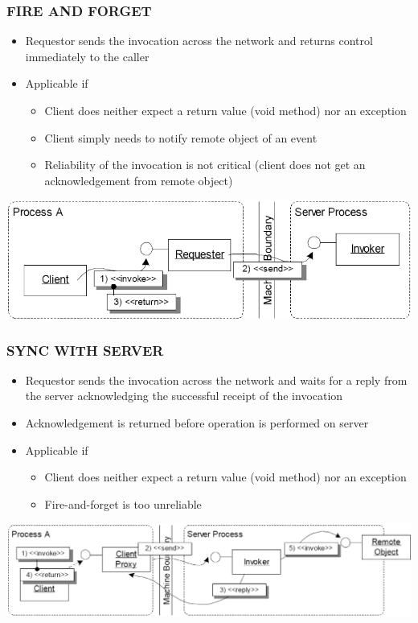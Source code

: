 \documentclass[10pt]{article}
\begin{document}
\subsubsection{FIRE AND FORGET}
\begin{itemize}
	\item Requestor sends the invocation across the network and returns control immediately to the caller
	\item Applicable if
		\begin{itemize}
			\item Client does neither expect a return value (void method) nor an exception
			\item Client simply needs to notify remote object of an event
			\item Reliability of the invocation is not critical (client does not get an acknowledgement from remote object)
		\end{itemize}
\end{itemize}
\begin{center}
	\includegraphics[scale=0.2]{fire-and-forget.png}
\end{center}
\subsubsection{SYNC WITH SERVER}
\begin{itemize}
	\item Requestor sends the invocation across the network and waits for a reply from the server acknowledging the successful receipt of the invocation
	\item Acknowledgement is returned before operation is performed on server
	\item Applicable if
		\begin{itemize}
			\item Client does neither expect a return value (void method) nor an exception
			\item Fire-and-forget is too unreliable
		\end{itemize}
\end{itemize}
\begin{center}
	\includegraphics[scale=0.2]{sync-with-server.png}
\end{center}
\end{document}
